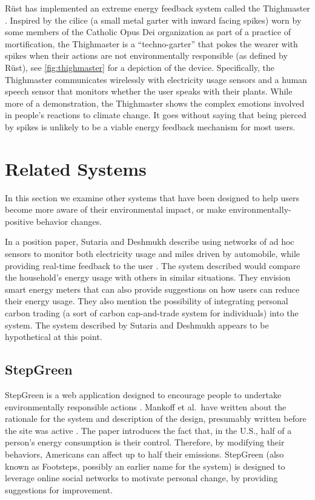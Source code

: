 R\"{u}st has implemented an extreme energy feedback system called the Thighmaster \cite{Rust2008Thighmaster-web}. Inspired by the cilice (a small metal garter with inward facing spikes) worn by some members of the Catholic Opus Dei organization as part of a practice of mortification, the Thighmaster is a ``techno-garter'' that pokes the wearer with spikes when their actions are not environmentally responsible (as defined by R\"{u}st), see \autoref{fig:thighmaster} for a depiction of the device. Specifically, the Thighmaster communicates wirelessly with electricity usage sensors and a human speech sensor that monitors whether the user speaks with their plants. While more of a demonstration, the Thighmaster shows the complex emotions involved in people's reactions to climate change. It goes without saying that being pierced by spikes is unlikely to be a viable energy feedback mechanism for most users.


\section{Related Systems}
\label{sec:related-systems}

In this section we examine other systems that have been designed to help users become more aware of their environmental impact, or make environmentally-positive behavior changes.

In a position paper, Sutaria and Deshmukh describe using networks of ad hoc sensors to monitor both electricity usage and miles driven by automobile, while providing real-time feedback to the user \cite{sutaria-2008}. The system described would compare the household's energy usage with others in similar situations. They envision smart energy meters that can also provide suggestions on how users can reduce their energy usage. They also mention the possibility of integrating personal carbon trading (a sort of carbon cap-and-trade system for individuals) into the system. The system described by Sutaria and Deshmukh appears to be hypothetical at this point.

\subsection{StepGreen}
\label{sec:stepgreen}

StepGreen is a web application designed to encourage people to undertake environmentally responsible actions \cite{step-green-website}. Mankoff et al.\ have written about the rationale for the system and description of the design, presumably written before the site was active \cite{Mankoff2007Leveraging-Soci} . The paper introduces the fact that, in the U.S., half of a person's energy consumption is their control. Therefore, by modifying their behaviors, Americans can affect up to half their \COtwo emissions. StepGreen (also known as Footsteps, possibly an earlier name for the system) is designed to leverage online social networks to motivate personal change, by providing suggestions for improvement.

